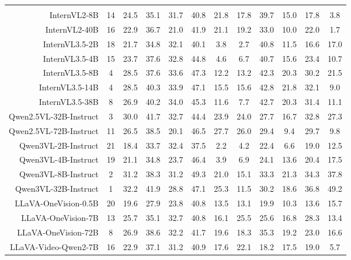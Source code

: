 \begin{figure}[ht!]
{\begin{tabular}{r|cc|ccccccccc}
\rowcolor{green!10}
\multicolumn{1}{l|}{\textcolor{black}{\textit{Open-source Models}}} & & & & & & & & & & & \\
InternVL2-8B & 14 & 24.5 & 35.1 & 31.7 & 40.8 & 21.8 & 17.8 & 39.7 & 15.0 & 17.8 & 3.8 \\
InternVL2-40B & 16 & 22.9 & 36.7 & 21.0 & 41.9 & 21.1 & 19.2 & 33.0 & 10.0 & 22.0 & 1.7 \\
InternVL3.5-2B & 18 & 21.7 & 34.8 & 32.1 & 40.1 & 3.8 & 2.7 & 40.8 & 11.5 & 16.6 & 17.0 \\
InternVL3.5-4B & 15 & 23.7 & 37.6 & 32.8 & 44.8 & 4.6 & 6.7 & 40.7 & 15.6 & 23.4 & 10.7 \\
InternVL3.5-8B & 4 & 28.5 & 37.6 & 33.6 & 47.3 & 12.2 & 13.2 & 42.3 & 20.3 & 30.2 & 21.5 \\
InternVL3.5-14B & 4 & 28.5 & 40.3 & 33.9 & 47.1 & 15.5 & 15.6 & \cellcolor{deeper-gray}42.8 & 21.8 & 32.1 & 9.0 \\
InternVL3.5-38B & 8 & 26.9 & 40.2 & 34.0 & 45.3 & 11.6 & 7.7 & \cellcolor{light-gray}42.7 & 20.3 & 31.4 & 11.1 \\
Qwen2.5VL-32B-Instruct & 3 & 30.0 & 41.7 & 32.7 & 44.4 & 23.9 & 24.0 & 27.7 & 16.7 & 32.8 & 27.3 \\
Qwen2.5VL-72B-Instruct & 11 & 26.5 & 38.5 & 20.1 & 46.5 & 27.7 & 26.0 & 29.4 & 9.4 & 29.7 & 9.8 \\
Qwen3VL-2B-Instruct & 21 & 18.4 & 33.7 & 32.4 & 37.5 & 2.2 & 4.2 & 22.4 & 6.6 & 19.0 & 12.5 \\
Qwen3VL-4B-Instruct & 19 & 21.1 & 34.8 & 23.7 & 46.4 & 3.9 & 6.9 & 24.1 & 13.6 & 20.4 & 17.5 \\
Qwen3VL-8B-Instruct & 2 & 31.2 & 38.3 & 31.2 & 49.3 & 21.0 & 15.1 & 33.3 & 21.3 & \cellcolor{light-gray}34.3 & 37.8 \\
Qwen3VL-32B-Instruct & 1 & \cellcolor{light-gray}32.2 & \cellcolor{light-gray}41.9 & 28.8 & 47.1 & 25.3 & 11.5 & 30.2 & 18.6 & \cellcolor{deeper-gray}36.8 & \cellcolor{deeper-gray}49.2 \\
LLaVA-OneVision-0.5B & 20 & 19.6 & 27.9 & 23.8 & 40.8 & 13.5 & 13.1 & 19.9 & 10.3 & 13.6 & 15.7 \\
LLaVA-OneVision-7B & 13 & 25.7 & 35.1 & 32.7 & 40.8 & 16.1 & 25.5 & 25.6 & 16.8 & 28.3 & 13.4 \\
LLaVA-OneVision-72B & 8 & 26.9 & 38.6 & 32.2 & 41.7 & 19.6 & 18.3 & 35.3 & 19.2 & 23.0 & 16.6 \\
LLaVA-Video-Qwen2-7B & 16 & 22.9 & 37.1 & 31.2 & 40.9 & 17.6 & 22.1 & 18.2 & 17.5 & 19.0 & 5.7 \\

\end{tabular}}
\end{figure}
